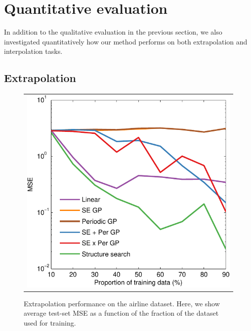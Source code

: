 \documentclass[twoside]{article}
\begin{document}


\section{Quantitative evaluation}
\label{sec:quantitative}

In addition to the qualitative evaluation in the previous section, we also investigated quantitatively how our method performs on both extrapolation and interpolation tasks.

\subsection{Extrapolation}

\begin{figure}[h!]
\centering
\begin{tabular}{c}
\hspace{-0.5cm} \includegraphics[width=0.95\columnwidth]{../figures/extrapolation_curves/01-airline-s-ex-curve_hint.pdf}
\end{tabular}
\caption{Extrapolation performance on the airline dataset.  Here, we show average test-set MSE as a function of the fraction of the dataset used for training. 
}
\label{fig:extrapolation}
\end{figure}
\end{document}
